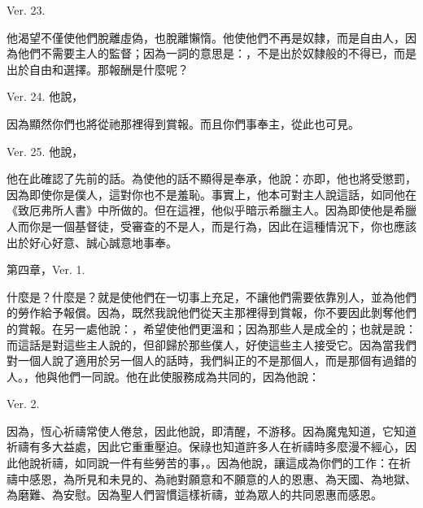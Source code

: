Ver. 23. \par

他渴望不僅使他們脫離虛偽，也脫離懶惰。他使他們不再是奴隸，而是自由人，因為他們不需要主人的監督；因為一詞的意思是：，不是出於奴隸般的不得已，而是出於自由和選擇。那報酬是什麼呢？\par

Ver. 24. 他說，\par

因為顯然你們也將從祂那裡得到賞報。而且你們事奉主，從此也可見。\par

Ver. 25. 他說，\par

他在此確認了先前的話。為使他的話不顯得是奉承，他說：亦即，他也將受懲罰，因為即使你是僕人，這對你也不是羞恥。事實上，他本可對主人說這話，如同他在《致厄弗所人書》中所做的。但在這裡，他似乎暗示希臘主人。因為即使他是希臘人而你是一個基督徒，受審查的不是人，而是行為，因此在這種情況下，你也應該出於好心好意、誠心誠意地事奉。\par

第四章，Ver. 1. \par

什麼是？什麼是？就是使他們在一切事上充足，不讓他們需要依靠別人，並為他們的勞作給予報償。因為，既然我說他們從天主那裡得到賞報，你不要因此剝奪他們的賞報。在另一處他說：，希望使他們更溫和；因為那些人是成全的；也就是說：而這話是對這些主人說的，但卻歸於那些僕人，好使這些主人接受它。因為當我們對一個人說了適用於另一個人的話時，我們糾正的不是那個人，而是那個有過錯的人。，他與他們一同說。他在此使服務成為共同的，因為他說：\par

Ver. 2. \par

因為，恆心祈禱常使人倦怠，因此他說，即清醒，不游移。因為魔鬼知道，它知道祈禱有多大益處，因此它重重壓迫。保祿也知道許多人在祈禱時多麼漫不經心，因此他說祈禱，如同說一件有些勞苦的事，。因為他說，讓這成為你們的工作：在祈禱中感恩，為所見和未見的、為祂對願意和不願意的人的恩惠、為天國、為地獄、為磨難、為安慰。因為聖人們習慣這樣祈禱，並為眾人的共同恩惠而感恩。\par

